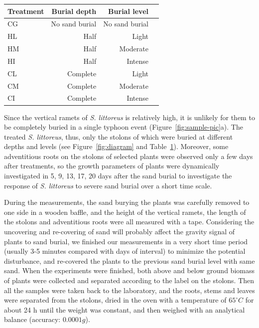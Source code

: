 \documentclass[]{interact}
\theoremstyle{plain}%
\theoremstyle{definition}
\theoremstyle{remark}
\begin{document}
\begin{table}
  {\begin{tabular}{lrrr} 
  \toprule
   Treatment & Burial depth & Burial level \\ 
  \midrule
   CG & No sand burial & No sand burial \\
   HL & Half & Light \\
   HM & Half & Moderate \\
   HI & Half & Intense \\
   CL & Complete & Light \\
   CM & Complete & Moderate \\
   CI & Complete & Intense \\
  \bottomrule
  \end{tabular}}
  \label{tab:treatment}
\end{table}

Since the vertical ramets of \textit{S. littoreus} is relatively high, it is unlikely for them to be completely buried in a single typhoon event (Figure~\ref{fig:sample-pic}a). The treated \textit{S. littoreus}, thus, only the stolons of which were buried at different depths and levels (see Figure~\ref{fig:diagram} and Table~\ref{tab:treatment}). Moreover, some adventitious roots on the stolons of selected plants were observed only a few days after treatments, so the growth parameters of plants were dynamically investigated in 5, 9, 13, 17, 20 days after the sand burial to investigate the response of \textit{S. littoreus} to severe sand burial over a short time scale.

During the measurements, the sand burying the plants was carefully removed to one side in a wooden baffle, and the height of the vertical ramets, the length of the stolons and adventitious roots were all measured with a tape. Considering the uncovering and re-covering of sand will probably affect the gravity signal of plants to sand burial, we finished our measurements in a very short time period (usually 3-5 minutes compared with days of interval) to minimize the potential disturbance, and re-covered the plants to the previous sand burial level with same sand. When the experiments were finished, both above and below ground biomass of plants were collected and separated according to the label on the stolons. Then all the samples were taken back to the laboratory, and the roots, stems and leaves were separated from the stolons, dried in the oven with a temperature of $65^{\circ}C$ for about 24 h until the weight was constant, and then weighed with an analytical balance (accuracy: $0.0001g$).
\end{document}
